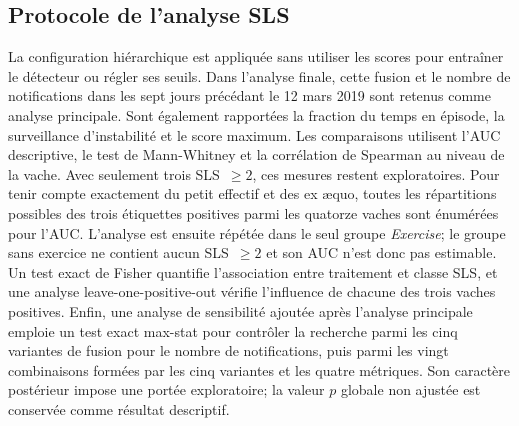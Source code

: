 \subsection{Protocole de l'analyse SLS}
La configuration hiérarchique est appliquée sans utiliser les scores pour entraîner le
détecteur ou régler ses seuils. Dans l'analyse finale, cette fusion et le nombre de notifications
dans les sept jours précédant le 12 mars 2019 sont retenus comme analyse principale. Sont également
rapportées la fraction du temps en épisode, la surveillance d'instabilité et le score
maximum. Les comparaisons utilisent l'AUC descriptive, le test de Mann-Whitney et la
corrélation de Spearman au niveau de la vache. Avec seulement trois SLS~$\geq2$, ces mesures
restent exploratoires. Pour tenir compte exactement du petit effectif et des ex æquo, toutes
les répartitions possibles des trois étiquettes positives parmi les quatorze vaches sont
énumérées pour l'AUC. L'analyse est ensuite répétée dans le seul groupe
\textit{Exercise}; le groupe sans exercice ne contient aucun SLS~$\geq2$ et son AUC n'est
donc pas estimable. Un test exact de Fisher quantifie l'association entre traitement et
classe SLS, et une analyse leave-one-positive-out vérifie l'influence de chacune des trois
vaches positives. Enfin, une analyse de sensibilité ajoutée après l'analyse principale emploie
un test exact max-stat pour contrôler la recherche parmi les cinq variantes de fusion pour le
nombre de notifications, puis parmi les vingt combinaisons formées par les cinq variantes et
les quatre métriques. Son caractère postérieur impose une portée exploratoire; la valeur $p$
globale non ajustée est conservée comme résultat descriptif.
